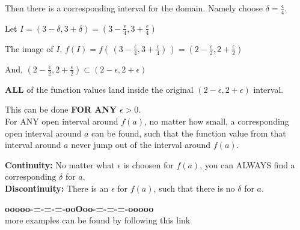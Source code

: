 \documentclass{ximera}
\begin{document}
\begin{example}
\begin{explanation}
Then there is a corresponding interval for the domain. Namely choose $\delta = \frac{\epsilon}{4}$.

Let $I = (3 - \delta, 3 + \delta) = \left(3 - \frac{\epsilon}{4}, 3 + \frac{\epsilon}{4}\right)$


The image of $I$, $f(I) = f\left(\,\left(3 - \frac{\epsilon}{4}, 3 + \frac{\epsilon}{4}\right)\,\right) = \left(2 - \frac{\epsilon}{2}, 2 + \frac{\epsilon}{2}\right)$

And, $\left(2 - \frac{\epsilon}{2}, 2 + \frac{\epsilon}{2}\right) \subset  (2 - \epsilon, 2 + \epsilon) $


\textbf{ALL} of the function values land inside the original $(2 - \epsilon, 2 + \epsilon)$ interval.


This can be done \textbf{\textcolor{red!70!black}{FOR ANY}} $\epsilon > 0$. \\


For ANY open interval around $f(a)$, no matter how small, a corresponding open interval around $a$ can be found, such that the function value from that interval around $a$ never jump out of the interval around $f(a)$.










\end{explanation}
\end{example}





\textbf{Continuity:} No matter what $\epsilon$ is choosen for $f(a)$, you can ALWAYS find a corresponding $\delta$ for $a$. \\



\textbf{Discontinuity:} There is an $\epsilon$ for $f(a)$, such that there is no $\delta$ for $a$. \\

























\begin{center}
\textbf{\textcolor{green!50!black}{ooooo-=-=-=-ooOoo-=-=-=-ooooo}} \\

more examples can be found by following this link\\ 

\end{center}
\end{document}
